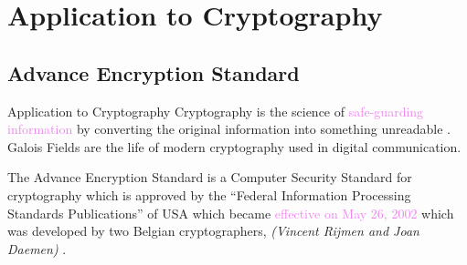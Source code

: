 \documentclass{beamer}
\begin{document}
\section{Application to Cryptography}
\subsection{Advance Encryption Standard}
\begin{frame}{Application to Cryptography}
  Cryptography is the science of \textcolor{violet}{safe-guarding information} by converting the original information into something unreadable \cite{aes}. Galois Fields are the life of modern cryptography used in digital communication.
  \vspace{7mm}

  \begin{tcolorbox}[colback=white, colframe=brown!80!black, boxsep=1mm, title={Advance Encryption Standard(AES)}]
    The Advance Encryption Standard is a Computer Security Standard for cryptography which is approved by the ``Federal Information Processing Standards Publications'' of USA which became \textcolor{violet}{effective on May 26, 2002} which was developed by \textcolor{green!50!black}{two Belgian cryptographers, \textit{(Vincent Rijmen and Joan Daemen)}} \cite{aes}.
  \end{tcolorbox}
\end{frame}
\end{document}
